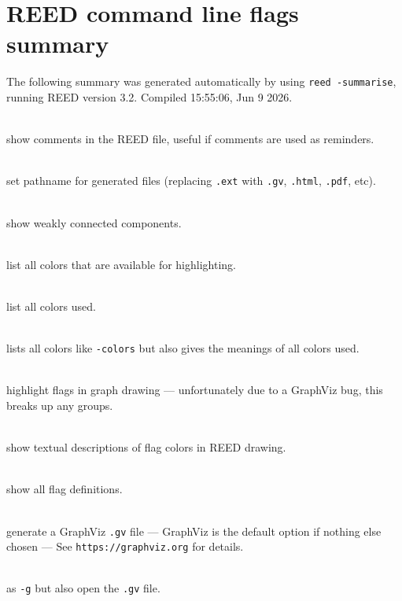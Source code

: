 \section{REED command line flags summary}\label{flagsSummary}
The following summary was generated automatically by using \texttt{reed~-summarise}, running REED version 3.2. Compiled 15:55:06, Jun  9 2026.
\vskip 5mm\begin{description}\raggedright
\item[\tt -\#]~\\ show comments in the REED file, useful if comments are used as reminders.

\item[\tt -basename <path/file.ext>]~\\ set pathname for generated files (replacing \texttt{.ext} with \texttt{.gv}, \texttt{.html}, \texttt{.pdf}, etc).

\item[\tt -c]~\\ show weakly connected components.

\item[\tt -allcolors]~\\ list all colors that are available for highlighting.

\item[\tt -colors]~\\ list all colors used.

\item[\tt -colors+]~\\ lists all colors like \texttt{-colors} but also gives the meanings of all colors used.

\item[\tt -F]~\\ highlight flags in graph drawing --- unfortunately due to a GraphViz bug, this breaks up any groups.

\item[\tt -f]~\\ show textual descriptions of flag colors in REED drawing.

\item[\tt -flags]~\\ show all flag definitions.

\item[\tt -g]~\\ generate a GraphViz \texttt{.gv} file --- GraphViz is the default option if nothing else chosen --- See \texttt{https://graphviz.org} for details.

\item[\tt -go]~\\ as \texttt{-g} but also open the \texttt{.gv} file.


\end{description}

